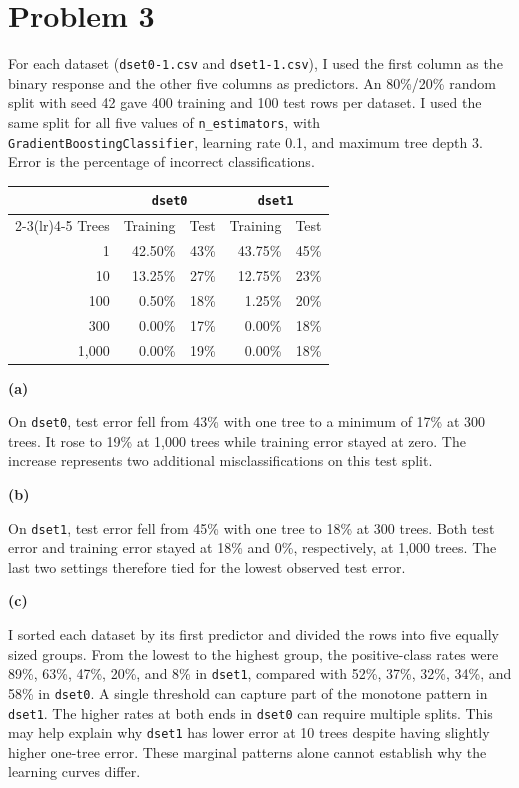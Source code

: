 \documentclass[11pt,letterpaper]{article}
\newcommand{\partlabel}[1]{\par\medskip\textbf{(#1)}\par}
\begin{document}
\clearpage
\section*{Problem 3}

For each dataset (\texttt{dset0-1.csv} and \texttt{dset1-1.csv}), I used the
first column as the binary response and the other
five columns as predictors. An 80\%/20\% random split with seed 42 gave 400
training and 100 test rows per dataset. I used the same split for all five
values of \texttt{n\_estimators}, with \texttt{GradientBoostingClassifier},
learning rate 0.1, and maximum tree depth 3. Error is the percentage of
incorrect classifications.

\begin{center}
\begin{tabular}{rrrrr}
\toprule
& \multicolumn{2}{c}{\texttt{dset0}} & \multicolumn{2}{c}{\texttt{dset1}} \\
\cmidrule(lr){2-3}\cmidrule(lr){4-5}
Trees & Training & Test & Training & Test \\
\midrule
1     & 42.50\% & 43\% & 43.75\% & 45\% \\
10    & 13.25\% & 27\% & 12.75\% & 23\% \\
100   &  0.50\% & 18\% &  1.25\% & 20\% \\
300   &  0.00\% & 17\% &  0.00\% & 18\% \\
1,000 &  0.00\% & 19\% &  0.00\% & 18\% \\
\bottomrule
\end{tabular}
\end{center}

\partlabel{a}
On \texttt{dset0}, test error fell from 43\% with one tree to a minimum of 17\%
at 300 trees. It rose to 19\% at 1,000 trees while training error stayed at
zero. The increase represents two additional misclassifications on this test
split.

\partlabel{b}
On \texttt{dset1}, test error fell from 45\% with one tree to 18\% at 300 trees.
Both test error and training error stayed at 18\% and 0\%, respectively, at
1,000 trees. The last two settings therefore tied for the lowest observed
test error.

\partlabel{c}
I sorted each dataset by its first predictor and divided the rows into five
equally sized groups. From the lowest to the highest group, the positive-class
rates were 89\%, 63\%, 47\%, 20\%, and 8\% in \texttt{dset1}, compared with
52\%, 37\%, 32\%, 34\%, and 58\% in \texttt{dset0}. A single threshold can
capture part of the monotone pattern in \texttt{dset1}. The higher rates at both
ends in \texttt{dset0} can require multiple splits. This may help explain why
\texttt{dset1} has lower error at 10 trees despite having slightly higher
one-tree error. These marginal patterns alone cannot establish why the
learning curves differ.
\end{document}
